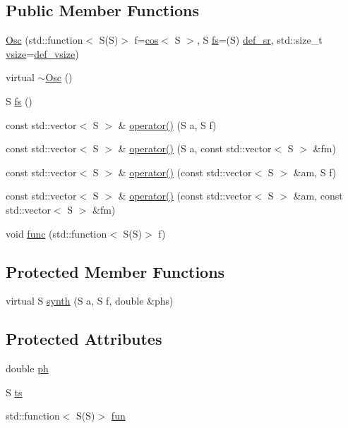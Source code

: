 \subsection*{Public Member Functions}
\begin{DoxyCompactItemize}
\item 
\hyperlink{class_aurora_1_1_osc_ac97decabac1a41e2556039548f8feab4}{Osc} (std\+::function$<$ S(S)$>$ f=\hyperlink{namespace_aurora_ab6ef1b966b8f27d107fcabe1027a677a}{cos}$<$ S $>$, S \hyperlink{class_aurora_1_1_osc_a0a156f9d14f246ea4e7b1cf2bcbf2c4c}{fs}=(S) \hyperlink{namespace_aurora_ad49263d809bea98dd422e95bc91bc03e}{def\+\_\+sr}, std\+::size\+\_\+t \hyperlink{class_aurora_1_1_snd_base_ad68387541cc3d696d0cf58d474f94b73}{vsize}=\hyperlink{namespace_aurora_afaaddf667a06e7ce23c667a8b7295263}{def\+\_\+vsize})
\item 
virtual \hyperlink{class_aurora_1_1_osc_a95062ac1670f5de00a27c33bfb4eb117}{$\sim$\+Osc} ()
\item 
S \hyperlink{class_aurora_1_1_osc_a0a156f9d14f246ea4e7b1cf2bcbf2c4c}{fs} ()
\item 
const std\+::vector$<$ S $>$ \& \hyperlink{class_aurora_1_1_osc_a2a36c0afda86b6fabad4ed3ca0f510af}{operator()} (S a, S f)
\item 
const std\+::vector$<$ S $>$ \& \hyperlink{class_aurora_1_1_osc_af48611ef63363221de325d8976a1ec56}{operator()} (S a, const std\+::vector$<$ S $>$ \&fm)
\item 
const std\+::vector$<$ S $>$ \& \hyperlink{class_aurora_1_1_osc_a28fe97e5634b8a02474657ed456c326b}{operator()} (const std\+::vector$<$ S $>$ \&am, S f)
\item 
const std\+::vector$<$ S $>$ \& \hyperlink{class_aurora_1_1_osc_a06f9ead5fbf828f7ebb8617ac6cb24b4}{operator()} (const std\+::vector$<$ S $>$ \&am, const std\+::vector$<$ S $>$ \&fm)
\item 
void \hyperlink{class_aurora_1_1_osc_a1ffdfa0db8932dbaa7cc96e046a6d461}{func} (std\+::function$<$ S(S)$>$ f)
\end{DoxyCompactItemize}
\subsection*{Protected Member Functions}
\begin{DoxyCompactItemize}
\item 
virtual S \hyperlink{class_aurora_1_1_osc_a4e01fb1238c931c944b6b27c3790495e}{synth} (S a, S f, double \&phs)
\end{DoxyCompactItemize}
\subsection*{Protected Attributes}
\begin{DoxyCompactItemize}
\item 
double \hyperlink{class_aurora_1_1_osc_ac649d41b585b377b17eeba66a18dbcc2}{ph}
\item 
S \hyperlink{class_aurora_1_1_osc_a2c7ae380eade4eee2e6035856ed0dcbe}{ts}
\item 
std\+::function$<$ S(S)$>$ \hyperlink{class_aurora_1_1_osc_a18c443a23a6d1fc2e63ba1ee09e97bc4}{fun}
\end{DoxyCompactItemize}


